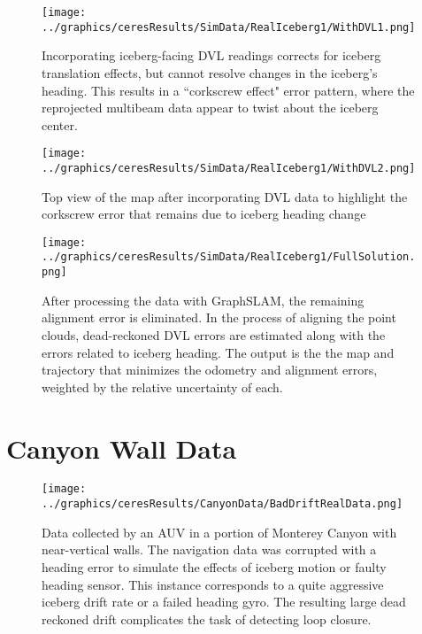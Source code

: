  \begin{figure}[htbp]
   \centering
   \texttt{[image: ../graphics/ceresResults/SimData/RealIceberg1/WithDVL1.png]} %
   \caption{Incorporating iceberg-facing DVL readings corrects for iceberg translation effects, but cannot resolve changes in the iceberg's heading. This results in a ``corkscrew effect" error pattern, where the reprojected multibeam data appear to twist about the iceberg center.}
   \label{fig:WithDVL1}
\end{figure}

 \begin{figure}[htbp]
   \centering
   \texttt{[image: ../graphics/ceresResults/SimData/RealIceberg1/WithDVL2.png]} %
   \caption{Top view of the map after incorporating DVL data to highlight the corkscrew error that remains due to iceberg heading change}
   \label{fig:WithDVL2}
\end{figure}

 \begin{figure}[htbp]
   \centering
   \texttt{[image: ../graphics/ceresResults/SimData/RealIceberg1/FullSolution.png]} %
   \caption{After processing the data with GraphSLAM, the remaining alignment error is eliminated. In the process of aligning the point clouds, dead-reckoned DVL errors are estimated along with the errors related to iceberg heading. The output is the the map and trajectory that minimizes the odometry and alignment errors, weighted by the relative uncertainty of each. }
   \label{fig:FullSimSol}
\end{figure}

\section{Canyon Wall Data}

 \begin{figure}[htbp]
   \centering
   \texttt{[image: ../graphics/ceresResults/CanyonData/BadDriftRealData.png]} %
   \caption{Data collected by an AUV in a portion of Monterey Canyon with near-vertical walls. The navigation data was corrupted with a heading error to simulate the effects of iceberg motion or faulty heading sensor. This instance corresponds to a quite aggressive iceberg drift rate or a failed heading gyro. The resulting large dead reckoned drift complicates the task of detecting loop closure.}
   \label{fig:RealDataWithDrift}
\end{figure}

